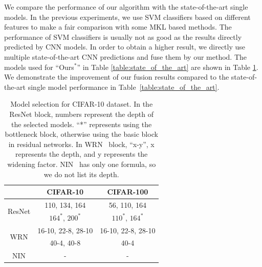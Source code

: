 \documentclass[letterpaper]{article} %
\begin{document}
We compare the performance of our algorithm with the state-of-the-art single models.
In the previous experiments, we use SVM classifiers based on different features to make a fair comparison with some MKL based methods.
The performance of SVM classifiers is usually not as good as the results directly predicted by CNN models.
In order to obtain a higher result, we directly use multiple state-of-the-art CNN predictions and fuse them by our method.
The models used for ``Ours$^{*}$'' in Table \ref{table:state_of_the_art} are shown in Table \ref{table:models}.
We demonstrate the improvement of our fusion results compared to the state-of-the-art single model performance in Table~\ref{table:state_of_the_art}.

\begin{table}[ht]
\centering
\begin{tabular}{| c | c | c |} \hline
                                           & CIFAR-10             & CIFAR-100  \\\hline
\multirow{2}{*}{ResNet} & 110, 134, 164    & 56, 110, 164  \\
                                           & $164^{*}$, $200^{*}$ & $110^{*}$, $164^{*}$  \\\hline
\multirow{2}{*}{WRN} & 16-10, 22-8, 28-10  & 16-10, 22-8, 28-10  \\
                                           &    40-4, 40-8        & 40-4  \\\hline
NIN                                        &     -                & -  \\ \hline
\end{tabular}
\caption{Model selection for CIFAR-10 dataset.
In the ResNet block, numbers represent the depth of the selected models.
``*'' represents using the bottleneck block, otherwise using the basic block in residual networks.
In WRN~\cite{zagoruyko2016wide} block, ``x-y'', x represents the depth, and y represents the widening factor.
NIN~\cite{lin2013network} has only one formula, so we do not list its depth.}
\label{table:models}
\end{table}
\end{document}
